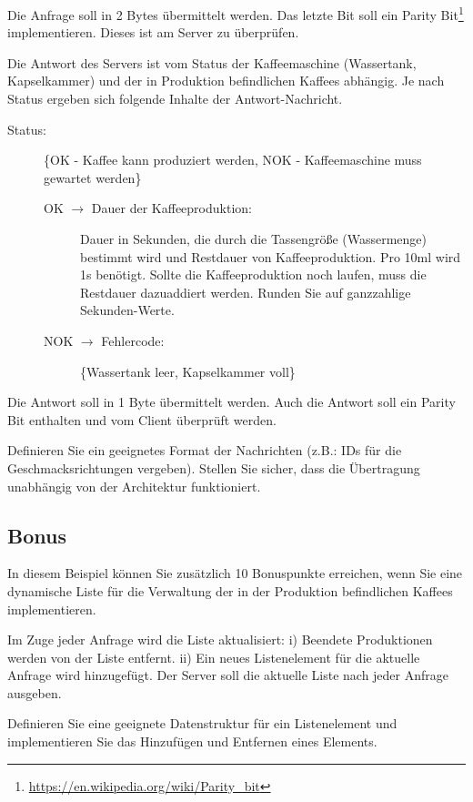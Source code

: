 Die Anfrage soll in 2 Bytes übermittelt werden. Das letzte Bit soll ein Parity
Bit\footnote{\url{https://en.wikipedia.org/wiki/Parity_bit}}
implementieren. Dieses ist am Server zu überprüfen.

Die Antwort des Servers ist vom Status der Kaffeemaschine (Wassertank,
Kapselkammer) und der in Produktion befindlichen Kaffees abhängig. Je nach
Status ergeben sich folgende Inhalte der Antwort-Nachricht.
%
\begin{description}
\item[Status:] \{OK - Kaffee kann produziert werden, NOK - Kaffeemaschine muss
  gewartet werden\}
  \begin{description}
  \item[OK $\rightarrow$ Dauer der Kaffeeproduktion:] Dauer in Sekunden, die
    durch die Tassengröße (Wassermenge) bestimmt wird und Restdauer von
    Kaffeeproduktion. Pro 10ml wird 1s benötigt. Sollte die Kaffeeproduktion
    noch laufen, muss die Restdauer dazuaddiert werden. Runden Sie auf
    ganzzahlige Sekunden-Werte.
  \item[NOK $\rightarrow$ Fehlercode:] \{Wassertank leer, Kapselkammer voll\}
  \end{description}
\end{description}

Die Antwort soll in 1 Byte übermittelt werden. Auch die Antwort soll ein Parity
Bit enthalten und vom Client überprüft werden.

Definieren Sie ein geeignetes Format der Nachrichten (z.B.: IDs für die
Geschmacksrichtungen vergeben). Stellen Sie sicher, dass die Übertragung
unabhängig von der Architektur funktioniert.

\subsection*{Bonus}

In diesem Beispiel können Sie zusätzlich 10 Bonuspunkte erreichen, wenn Sie
eine dynamische Liste für die Verwaltung der in der Produktion befindlichen
Kaffees implementieren.

Im Zuge jeder Anfrage wird die Liste aktualisiert: i) Beendete Produktionen
werden von der Liste entfernt. ii) Ein neues Listenelement für die aktuelle
Anfrage wird hinzugefügt. Der Server soll die aktuelle Liste nach jeder Anfrage
ausgeben.

Definieren Sie eine geeignete Datenstruktur für ein Listenelement und
implementieren Sie das Hinzufügen und Entfernen eines Elements.


\osueguidelinesone


